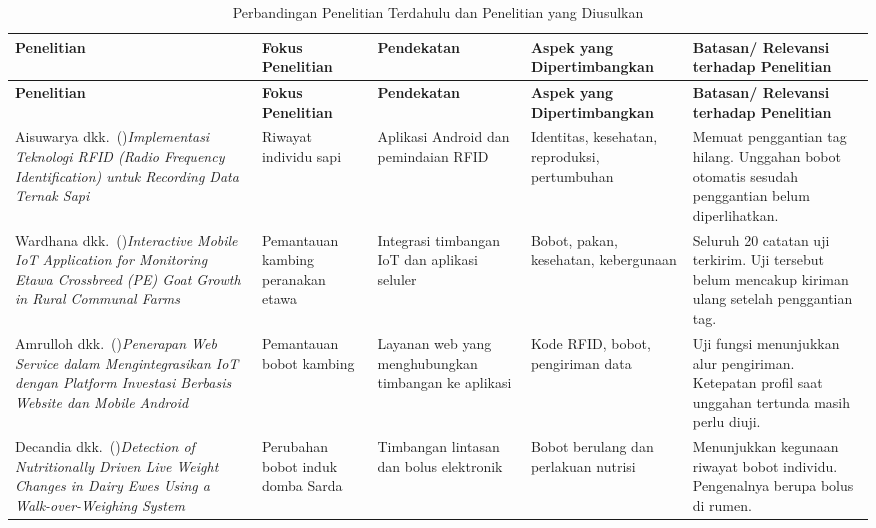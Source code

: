 \begingroup
\footnotesize\setlength{\tabcolsep}{2pt}
\renewcommand{\arraystretch}{1.08}
\begin{longtable}{@{}>{\raggedright\arraybackslash}p{.20\linewidth}>{\raggedright\arraybackslash}p{.155\linewidth}>{\raggedright\arraybackslash}p{.18\linewidth}>{\raggedright\arraybackslash}p{.17\linewidth}>{\raggedright\arraybackslash}p{.245\linewidth}@{}}
\caption{Perbandingan Penelitian Terdahulu dan Penelitian yang Diusulkan}\label{tab:penelitian-terdahulu}\\
\toprule
\textbf{Penelitian} & \textbf{Fokus Penelitian} & \textbf{Pendekatan} & \textbf{Aspek yang Dipertim\-bangkan} & \textbf{Batasan/ Relevansi terhadap Penelitian} \\
\midrule\endfirsthead
\toprule
\textbf{Penelitian} & \textbf{Fokus Penelitian} & \textbf{Pendekatan} & \textbf{Aspek yang Dipertim\-bangkan} & \textbf{Batasan/ Relevansi terhadap Penelitian} \\
\midrule\endhead
\midrule\endfoot
\bottomrule\endlastfoot
Aisuwarya dkk.~(\citeyear{aisuwarya2019rfid})\newline \textit{Implementasi Teknologi RFID (Radio Frequency Identification) untuk Recording Data Ternak Sapi} & Riwayat individu sapi & Aplikasi Android dan pemindaian RFID & Identitas, kesehatan, reproduksi, pertumbuhan & Memuat penggantian tag hilang. Unggahan bobot otomatis sesudah penggantian belum diperlihatkan. \\
Wardhana dkk.~(\citeyear{wardhana2026pemantauan})\newline \textit{Interactive Mobile IoT Application for Monitoring Etawa Crossbreed (PE) Goat Growth in Rural Communal Farms} & Pemantauan kambing peranakan etawa & Integrasi timbangan IoT dan aplikasi seluler & Bobot, pakan, kesehatan, kebergunaan & Seluruh 20 catatan uji terkirim. Uji tersebut belum mencakup kiriman ulang setelah penggantian tag. \\
Amrulloh dkk.~(\citeyear{amrulloh2024integrasi})\newline \textit{Penerapan Web Service dalam Mengintegrasikan IoT dengan Platform Investasi Berbasis Website dan Mobile Android} & Pemantauan bobot kambing & Layanan web yang menghubungkan timbangan ke aplikasi & Kode RFID, bobot, pengiriman data & Uji fungsi menunjukkan alur pengiriman. Ketepatan profil saat unggahan tertunda masih perlu diuji. \\
Decandia dkk.~(\citeyear{decandia2026domba})\newline \textit{Detection of Nutritionally Driven Live Weight Changes in Dairy Ewes Using a Walk-over-Weighing System} & Perubahan bobot induk domba Sarda & Timbangan lintasan dan bolus elektronik & Bobot berulang dan perlakuan nutrisi & Menunjukkan kegunaan riwayat bobot individu. Pengenalnya berupa bolus di rumen. \\

\end{longtable}
